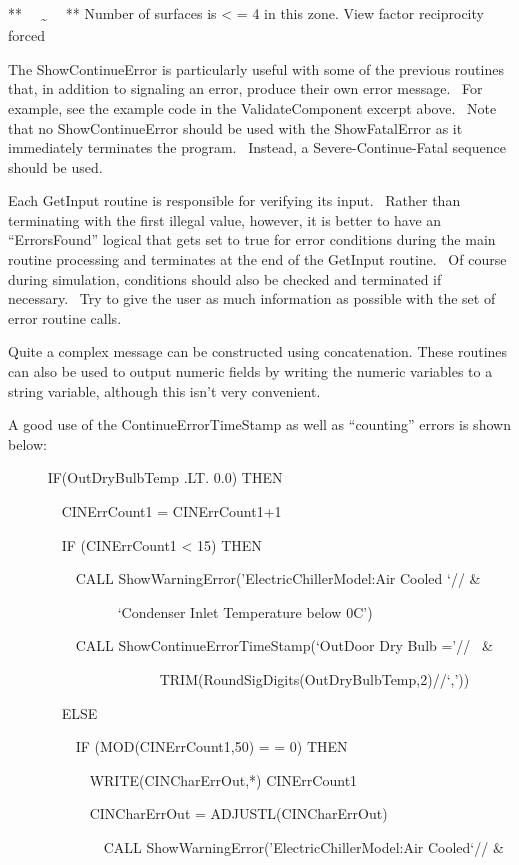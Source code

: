 **~~ \textsubscript{\textasciitilde{}}~~ ** Number of surfaces is \textless{} = 4 in this zone. View factor reciprocity forced

The ShowContinueError is particularly useful with some of the previous routines that, in addition to signaling an error, produce their own error message.~ For example, see the example code in the ValidateComponent excerpt above.~ Note that no ShowContinueError should be used with the ShowFatalError as it immediately terminates the program.~ Instead, a Severe-Continue-Fatal sequence should be used.

Each GetInput routine is responsible for verifying its input.~ Rather than terminating with the first illegal value, however, it is better to have an ``ErrorsFound'' logical that gets set to true for error conditions during the main routine processing and terminates at the end of the GetInput routine.~ Of course during simulation, conditions should also be checked and terminated if necessary.~ Try to give the user as much information as possible with the set of error routine calls.

Quite a complex message can be constructed using concatenation. These routines can also be used to output numeric fields by writing the numeric variables to a string variable, although this isn't very convenient.

A good use of the ContinueErrorTimeStamp as well as ``counting'' errors is shown below:

~~~~~ IF(OutDryBulbTemp .LT. 0.0) THEN

~~~~~~~ CINErrCount1 = CINErrCount1+1

~~~~~~~ IF (CINErrCount1 \textless{} 15) THEN

~~~~~~~~~ CALL ShowWarningError('ElectricChillerModel:Air Cooled `// \&

~~~~~~~~~~~~~~~ `Condenser Inlet Temperature below 0C')

~~~~~~~~~ CALL ShowContinueErrorTimeStamp(`OutDoor Dry Bulb ='//~ \&

~~~~~~~~~~~~~~~~~~~~~ TRIM(RoundSigDigits(OutDryBulbTemp,2)//`,'))

~~~~~~~ ELSE

~~~~~~~~~ IF (MOD(CINErrCount1,50) = = 0) THEN

~~~~~~~~~~~ WRITE(CINCharErrOut,*) CINErrCount1

~~~~~~~~~~~ CINCharErrOut = ADJUSTL(CINCharErrOut)

~~~~~~~~~~~~~ CALL ShowWarningError('ElectricChillerModel:Air Cooled`// \&

